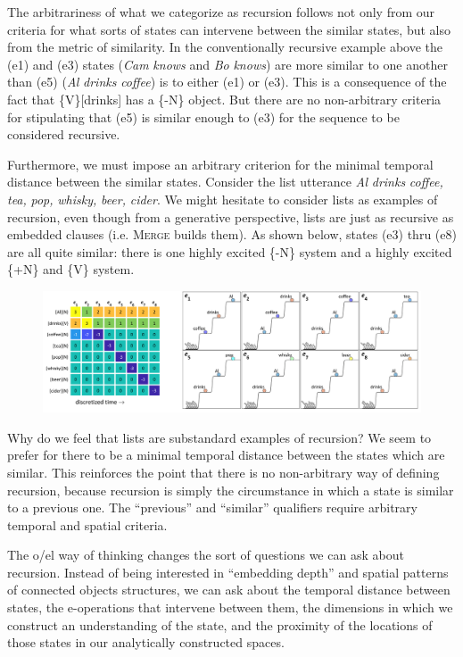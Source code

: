   The arbitrariness of what we categorize as recursion follows not only from our criteria for what sorts of states can intervene between the similar states, but also from the metric of similarity. In the conventionally recursive example above the (e1) and (e3) states (\textit{Cam} \textit{knows} and \textit{Bo} \textit{knows}) are more similar to one another than (e5) (\textit{Al} \textit{drinks} \textit{coffee}) is to either (e1) or (e3). This is a consequence of the fact that \{V\}[drinks] has a \{-N\} object. But there are no non-arbitrary criteria for stipulating that (e5) is similar enough to (e3) for the sequence to be considered recursive.

  Furthermore, we must impose an arbitrary criterion for the minimal temporal distance between the similar states. Consider the list utterance \textit{Al} \textit{drinks} \textit{coffee,} \textit{tea,} \textit{pop,} \textit{whisky,} \textit{beer,} \textit{cider}. We might hesitate to consider lists as examples of recursion, even though from a generative perspective, lists are just as recursive as embedded clauses (i.e. \textsc{Merge} builds them). As shown below, states (e3) thru (e8) are all quite similar: there is one highly excited \{-N\} system and a highly excited \{+N\} and \{V\} system.

  
\begin{figure}
\includegraphics[width=\textwidth]{figures/Tilsen-img114.png}
\caption{\missingcaption}
\label{fig:}
\end{figure}
 

  Why do we feel that lists are substandard examples of recursion? We seem to prefer for there to be a minimal temporal distance between the states which are similar. This reinforces the point that there is no non-arbitrary way of defining recursion, because recursion is simply the circumstance in which a state is similar to a previous one. The “previous” and “similar” qualifiers require arbitrary temporal and spatial criteria. 

  The o/el way of thinking changes the sort of questions we can ask about recursion. Instead of being interested in “embedding depth” and spatial patterns of connected objects structures, we can ask about the temporal distance between states, the e-operations that intervene between them, the dimensions in which we construct an understanding of the state, and the proximity of the locations of those states in our analytically constructed spaces.

